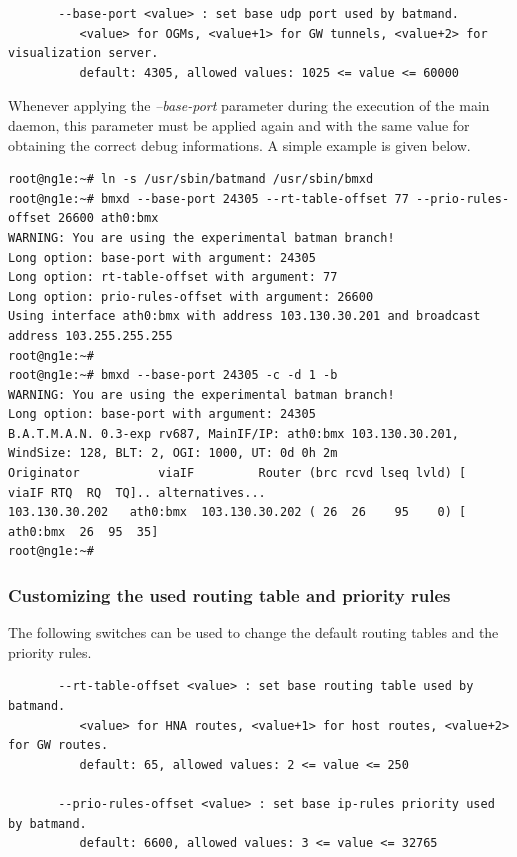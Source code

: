 \documentclass[11pt]{article}
\begin{document}
\begin{small} \begin{verbatim}
       --base-port <value> : set base udp port used by batmand.
          <value> for OGMs, <value+1> for GW tunnels, <value+2> for visualization server.
          default: 4305, allowed values: 1025 <= value <= 60000
\end{verbatim} \end{small}

Whenever applying the \emph{--base-port} parameter during the execution of the main daemon, this parameter must be applied again and with the same value for obtaining the correct debug informations. A simple example is given below.

\begin{small} \begin{verbatim}
root@ng1e:~# ln -s /usr/sbin/batmand /usr/sbin/bmxd
root@ng1e:~# bmxd --base-port 24305 --rt-table-offset 77 --prio-rules-offset 26600 ath0:bmx
WARNING: You are using the experimental batman branch!
Long option: base-port with argument: 24305
Long option: rt-table-offset with argument: 77
Long option: prio-rules-offset with argument: 26600
Using interface ath0:bmx with address 103.130.30.201 and broadcast address 103.255.255.255
root@ng1e:~#
root@ng1e:~# bmxd --base-port 24305 -c -d 1 -b
WARNING: You are using the experimental batman branch!
Long option: base-port with argument: 24305
B.A.T.M.A.N. 0.3-exp rv687, MainIF/IP: ath0:bmx 103.130.30.201, WindSize: 128, BLT: 2, OGI: 1000, UT: 0d 0h 2m
Originator           viaIF         Router (brc rcvd lseq lvld) [    viaIF RTQ  RQ  TQ].. alternatives...
103.130.30.202   ath0:bmx  103.130.30.202 ( 26  26    95    0) [ ath0:bmx  26  95  35]
root@ng1e:~#

\end{verbatim} \end{small}

\subsubsection{Customizing the used routing table and priority rules}

The following switches can be used to change the default routing tables and the priority rules. 

\begin{small} \begin{verbatim}
       --rt-table-offset <value> : set base routing table used by batmand.
          <value> for HNA routes, <value+1> for host routes, <value+2> for GW routes.
          default: 65, allowed values: 2 <= value <= 250

       --prio-rules-offset <value> : set base ip-rules priority used by batmand.
          default: 6600, allowed values: 3 <= value <= 32765
\end{verbatim} \end{small}
\end{document}
